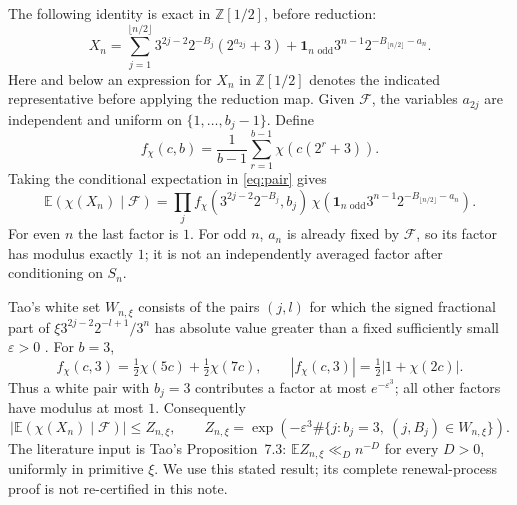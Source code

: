 \documentclass[11pt]{article}
\theoremstyle{remark}\newtheorem{remark}[proposition]{Remark}
\newcommand{\EE}{\mathbb E}
\newcommand{\ZZ}{\mathbb Z}
\newcommand{\one}{\mathbf 1}
\begin{document}
The following identity is exact in $\ZZ[1/2]$, before reduction:
\begin{equation}\label{eq:pair}
 X_n=\sum_{j=1}^{\lfloor n/2\rfloor}
       3^{2j-2}2^{-B_j}(2^{a_{2j}}+3)
       +\one_{n\text{ odd}}3^{n-1}2^{-B_{\lfloor n/2\rfloor}-a_n}.
\end{equation}
Here and below an expression for $X_n$ in $\ZZ[1/2]$ denotes the indicated
representative before applying the reduction map. Given $\mathcal F$, the
variables $a_{2j}$ are independent and uniform on $\{1,\ldots,b_j-1\}$.
Define
\[
 f_\chi(c,b)=\frac{1}{b-1}\sum_{r=1}^{b-1}\chi(c(2^r+3)).
\]
Taking the conditional expectation in \eqref{eq:pair} gives
\begin{equation}\label{eq:factor}
 \EE(\chi(X_n)\mid\mathcal F)
 =\prod_j f_\chi(3^{2j-2}2^{-B_j},b_j)\,
   \chi\!\left(\one_{n\text{ odd}}3^{n-1}
           2^{-B_{\lfloor n/2\rfloor}-a_n}\right).
\end{equation}
For even $n$ the last factor is $1$. For odd $n$, $a_n$ is already fixed
by $\mathcal F$, so its factor has modulus exactly $1$; it is not an
independently averaged factor after conditioning on $S_n$.

Tao's white set $W_{n,\xi}$ consists of the pairs $(j,l)$ for which the
signed fractional part of
$\xi3^{2j-2}2^{-l+1}/3^n$ has absolute value greater than a fixed sufficiently
small $\varepsilon>0$ \cite[\S7.1]{Tao7}.
For $b=3$,
\[
 f_\chi(c,3)=\tfrac12\chi(5c)+\tfrac12\chi(7c),\qquad
 |f_\chi(c,3)|=\tfrac12|1+\chi(2c)|.
\]
Thus a white pair with $b_j=3$ contributes a factor at most
$e^{-\varepsilon^3}$; all other factors have modulus at most $1$.
Consequently
\begin{equation}\label{eq:majorant}
 |\EE(\chi(X_n)\mid\mathcal F)|\leq Z_{n,\xi},\qquad
 Z_{n,\xi}=\exp\!\left(-\varepsilon^3
       \#\{j:b_j=3,\ (j,B_j)\in W_{n,\xi}\}\right).
\end{equation}
The literature input is Tao's Proposition~7.3:
$\EE Z_{n,\xi}\ll_D n^{-D}$ for every $D>0$, uniformly in primitive
$\xi$. We use this stated result; its complete renewal-process proof is
not re-certified in this note.
\end{document}
